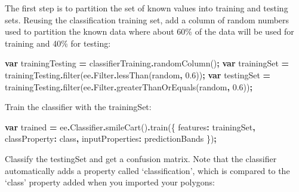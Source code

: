 \documentclass[
]{article}
\newenvironment{Shaded}{\begin{snugshade}}{\end{snugshade}}
\newcommand{\AttributeTok}[1]{\textcolor[rgb]{0.77,0.63,0.00}{#1}}
\newcommand{\DataTypeTok}[1]{\textcolor[rgb]{0.13,0.29,0.53}{#1}}
\newcommand{\FloatTok}[1]{\textcolor[rgb]{0.00,0.00,0.81}{#1}}
\newcommand{\FunctionTok}[1]{\textcolor[rgb]{0.00,0.00,0.00}{#1}}
\newcommand{\KeywordTok}[1]{\textcolor[rgb]{0.13,0.29,0.53}{\textbf{#1}}}
\newcommand{\NormalTok}[1]{#1}
\newcommand{\OperatorTok}[1]{\textcolor[rgb]{0.81,0.36,0.00}{\textbf{#1}}}
\newcommand{\StringTok}[1]{\textcolor[rgb]{0.31,0.60,0.02}{#1}}
\begin{document}
The first step is to partition the set of known values into training and testing sets. Reusing the classification training set, add a column of random numbers used to partition the known data where about 60\% of the data will be used for training and 40\% for testing:

\begin{Shaded}
\begin{Highlighting}[]
\KeywordTok{var}\NormalTok{ trainingTesting }\OperatorTok{=}\NormalTok{ classifierTraining}\OperatorTok{.}\FunctionTok{randomColumn}\NormalTok{()}\OperatorTok{;}
\KeywordTok{var}\NormalTok{ trainingSet }\OperatorTok{=}\NormalTok{ trainingTesting}\OperatorTok{.}\FunctionTok{filter}\NormalTok{(ee}\OperatorTok{.}\AttributeTok{Filter}\OperatorTok{.}\FunctionTok{lessThan}\NormalTok{(}\StringTok{\textquotesingle{}random\textquotesingle{}}\OperatorTok{,}  \FloatTok{0.6}\NormalTok{))}\OperatorTok{;}
\KeywordTok{var}\NormalTok{ testingSet }\OperatorTok{=}\NormalTok{ trainingTesting}\OperatorTok{.}\FunctionTok{filter}\NormalTok{(ee}\OperatorTok{.}\AttributeTok{Filter}\OperatorTok{.}\FunctionTok{greaterThanOrEquals}\NormalTok{(}\StringTok{\textquotesingle{}random\textquotesingle{}}\OperatorTok{,} \FloatTok{0.6}\NormalTok{))}\OperatorTok{;}  
\end{Highlighting}
\end{Shaded}

Train the classifier with the trainingSet:

\begin{Shaded}
\begin{Highlighting}[]
\KeywordTok{var}\NormalTok{ trained }\OperatorTok{=}\NormalTok{ ee}\OperatorTok{.}\AttributeTok{Classifier}\OperatorTok{.}\FunctionTok{smileCart}\NormalTok{()}\OperatorTok{.}\FunctionTok{train}\NormalTok{(\{}
  \DataTypeTok{features}\OperatorTok{:}\NormalTok{ trainingSet}\OperatorTok{,}
  \DataTypeTok{classProperty}\OperatorTok{:} \StringTok{\textquotesingle{}class\textquotesingle{}}\OperatorTok{,}
  \DataTypeTok{inputProperties}\OperatorTok{:}\NormalTok{ predictionBands}
\NormalTok{\})}\OperatorTok{;}  
\end{Highlighting}
\end{Shaded}

Classify the testingSet and get a confusion matrix. Note that the classifier automatically adds a property called `classification', which is compared to the `class' property added when you imported your polygons:
\end{document}
